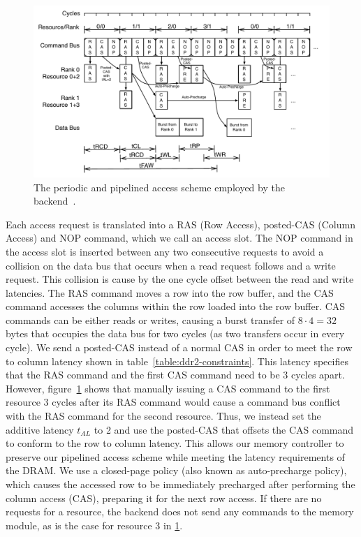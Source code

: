 \begin{figure}[h]
\begin{center}
\includegraphics[width=0.92\linewidth]{figs/backend}
\end{center} 
\caption{The periodic and pipelined access scheme employed by the backend~\cite{ReinekeLiuPatelKimLee11_PRETDRAMControllerBankPrivatizationForPredictability}.}
\label{fig:backend}
\end{figure}

Each access request is translated into a RAS (Row Access), posted-CAS (Column Access) and NOP command, which we call an access slot. 
The NOP command in the access slot is inserted between any two consecutive requests to avoid a collision on the data bus that occurs when a read request follows and a write request.
This collision is cause by the one cycle offset between the read and write latencies. 
The RAS command moves a row into the row buffer, and the CAS command accesses the columns within the row loaded into the row buffer. 
CAS commands can be either reads or writes, causing a burst transfer of $8 \cdot 4 = 32$ bytes that occupies the data bus for two cycles (as two transfers occur in every cycle).
We send a posted-CAS instead of a normal CAS in order to meet the row to column latency shown in table~\ref{table:ddr2-constraints}.
This latency specifies that the RAS command and the first CAS command need to be 3 cycles apart.  
However, figure~\ref{fig:backend} shows that manually issuing a CAS command to the first resource 3 cycles after its RAS command would cause a command bus conflict with the RAS command for the second resource.
Thus, we instead set the additive latency $t_{AL}$ to 2 and use the posted-CAS that offsets the CAS command to conform to the row to column latency.
This allows our memory controller to preserve our pipelined access scheme while meeting the latency requirements of the DRAM.   
We use a closed-page policy (also known as auto-precharge policy), which causes the accessed row to be immediately precharged after performing the column access (CAS), preparing it for the next row access.
If there are no requests for a resource, the backend does not send any commands to the memory module, as is the case for resource 3 in \ref{fig:backend}.

